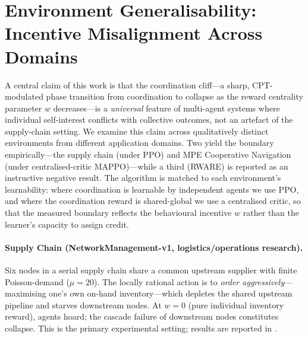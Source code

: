 \documentclass[11pt]{article}
\begin{document}
\section{Environment Generalisability: Incentive Misalignment Across Domains}
\label{sec:appendix_environments}

A central claim of this work is that the coordination cliff---a sharp, CPT-modulated
phase transition from coordination to collapse as the reward centrality parameter
$w$ decreases---is a \emph{universal} feature of multi-agent systems where individual
self-interest conflicts with collective outcomes, not an artefact of the supply-chain
setting.
We examine this claim across qualitatively distinct environments from different
application domains. Two yield the boundary empirically---the supply chain (under
PPO) and MPE Cooperative Navigation (under centralised-critic MAPPO)---while a
third (RWARE) is reported as an instructive negative result. The algorithm is
matched to each environment's learnability: where coordination is learnable by
independent agents we use PPO, and where the coordination reward is shared-global
we use a centralised critic, so that the measured boundary reflects the
behavioural incentive $w$ rather than the learner's capacity to assign credit.

\paragraph{Supply Chain (NetworkManagement-v1, logistics/operations research).}
Six nodes in a serial supply chain share a common upstream supplier with
finite Poisson-demand ($\mu=20$).  The locally rational action is to
\emph{order aggressively}---maximising one's own on-hand inventory---which
depletes the shared upstream pipeline and starves downstream nodes.
At $w{=}0$ (pure individual inventory reward), agents hoard; the cascade failure
of downstream nodes constitutes collapse.
This is the primary experimental setting; results are reported in
.
\end{document}
